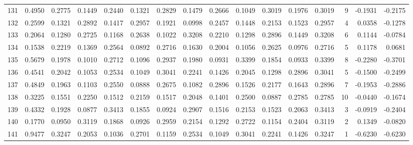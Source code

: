 \begin{tabular}{lrrrrrrrrrrrrrrr}
131 &      0.4950 &  0.2775 &  0.1449 &  0.2440 &  0.1321 &  0.2829 &  0.1479 &  0.2666 &  0.1049 &  0.3019 &   0.1976 &     0.3019 &      9 &                   -0.1931 &                    -0.2175 \\
132 &      0.2599 &  0.1321 &  0.2892 &  0.1417 &  0.2957 &  0.1921 &  0.0998 &  0.2457 &  0.1448 &  0.2153 &   0.1523 &     0.2957 &      4 &                    0.0358 &                    -0.1278 \\
133 &      0.2064 &  0.1280 &  0.2725 &  0.1168 &  0.2638 &  0.1022 &  0.3208 &  0.2210 &  0.1298 &  0.2896 &   0.1449 &     0.3208 &      6 &                    0.1144 &                    -0.0784 \\
134 &      0.1538 &  0.2219 &  0.1369 &  0.2564 &  0.0892 &  0.2716 &  0.1630 &  0.2004 &  0.1056 &  0.2625 &   0.0976 &     0.2716 &      5 &                    0.1178 &                     0.0681 \\
135 &      0.5679 &  0.1978 &  0.1010 &  0.2712 &  0.1096 &  0.2937 &  0.1980 &  0.0931 &  0.3399 &  0.1854 &   0.0933 &     0.3399 &      8 &                   -0.2280 &                    -0.3701 \\
136 &      0.4541 &  0.2042 &  0.1053 &  0.2534 &  0.1049 &  0.3041 &  0.2241 &  0.1426 &  0.2045 &  0.1298 &   0.2896 &     0.3041 &      5 &                   -0.1500 &                    -0.2499 \\
137 &      0.4849 &  0.1963 &  0.1103 &  0.2550 &  0.0888 &  0.2675 &  0.1082 &  0.2896 &  0.1526 &  0.2177 &   0.1643 &     0.2896 &      7 &                   -0.1953 &                    -0.2886 \\
138 &      0.3225 &  0.1551 &  0.2250 &  0.1512 &  0.2159 &  0.1517 &  0.2048 &  0.1401 &  0.2500 &  0.0887 &   0.2785 &     0.2785 &     10 &                   -0.0440 &                    -0.1674 \\
139 &      0.4332 &  0.1928 &  0.0877 &  0.3413 &  0.1855 &  0.0924 &  0.2907 &  0.1516 &  0.2153 &  0.1523 &   0.2063 &     0.3413 &      3 &                   -0.0919 &                    -0.2404 \\
140 &      0.1770 &  0.0950 &  0.3119 &  0.1868 &  0.0926 &  0.2959 &  0.2154 &  0.1292 &  0.2722 &  0.1154 &   0.2404 &     0.3119 &      2 &                    0.1349 &                    -0.0820 \\
141 &      0.9477 &  0.3247 &  0.2053 &  0.1036 &  0.2701 &  0.1159 &  0.2534 &  0.1049 &  0.3041 &  0.2241 &   0.1426 &     0.3247 &      1 &                   -0.6230 &                    -0.6230 \\

\end{tabular}
